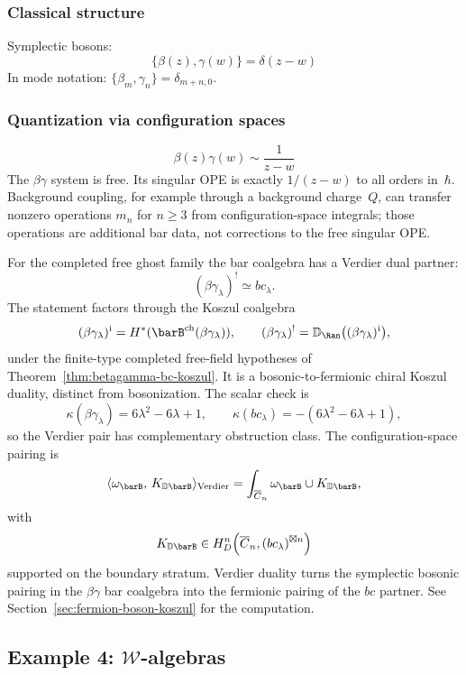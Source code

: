 \subsubsection{Classical structure}

Symplectic bosons:
\[\{\beta(z), \gamma(w)\} = \delta(z-w)\]
In mode notation: $\{\beta_m, \gamma_n\} = \delta_{m+n,0}$.

\subsubsection{Quantization via configuration spaces}

\[\beta(z)\gamma(w) \sim \frac{1}{z-w}\]
The $\beta\gamma$ system is free. Its singular OPE is exactly
$1/(z-w)$ to all orders in~$\hbar$. Background coupling, for example
through a background charge~$Q$, can transfer nonzero operations
$m_n$ for $n\geq3$ from configuration-space integrals; those
operations are additional bar data, not corrections to the free
singular OPE.

For the completed free ghost family the bar coalgebra has a Verdier
dual partner:
\[
(\beta\gamma_\lambda)^! \simeq bc_\lambda .
\]
The statement factors through the Koszul coalgebra
\[
(\beta\gamma_\lambda)^{\mathrm i}
 = H^*(\barB^{\mathrm{ch}}(\beta\gamma_\lambda)),
\qquad
(\beta\gamma_\lambda)^!
 = \mathbb D_{\Ran}\bigl((\beta\gamma_\lambda)^{\mathrm i}\bigr),
\]
under the finite-type completed free-field hypotheses of
Theorem~\ref{thm:betagamma-bc-koszul}. It is a
bosonic-to-fermionic chiral Koszul duality, distinct from
bosonization. The scalar check is
\[
\kappa(\beta\gamma_\lambda)
 = 6\lambda^2-6\lambda+1,\qquad
\kappa(bc_\lambda)
 = -(6\lambda^2-6\lambda+1),
\]
so the Verdier pair has complementary obstruction class. The
configuration-space pairing is
\[
\langle \omega_{\barB},\, K_{\mathbb D\barB} \rangle_{\mathrm{Verdier}}
 =
\int_{\overline{C}_n}
\omega_{\barB}\cup K_{\mathbb D\barB},
\]
with
\[
K_{\mathbb D\barB}
 \in H^n_D\!\left(\overline{C}_n,
 (bc_\lambda)^{\boxtimes n}\right)
\]
supported on the boundary stratum. Verdier duality turns the
symplectic bosonic pairing in the $\beta\gamma$ bar coalgebra into the
fermionic pairing of the $bc$ partner. See
Section~\ref{sec:fermion-boson-koszul} for the computation.

\subsection{Example 4: $\mathcal{W}$-algebras}

